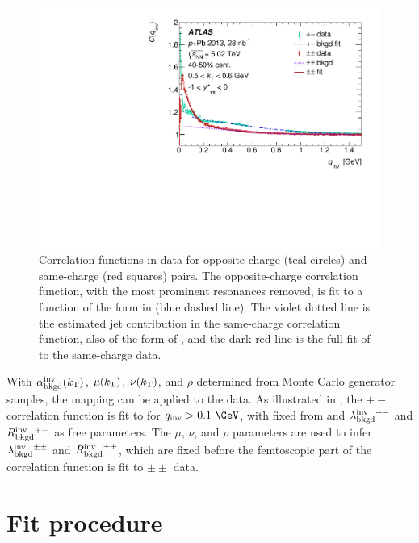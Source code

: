 \begin{figure}[t]
\centering
\includegraphics{cqinv_charge_comp_cent6_kt4_kys1.pdf}
\caption{Correlation functions in \pPb data for opposite-charge (teal circles) and same-charge (red squares) pairs. The opposite-charge correlation function, with the most prominent resonances removed, is fit to a function of the form in  (blue dashed line). The violet dotted line is the estimated jet contribution in the same-charge correlation function, also of the form of , and the dark red line is the full fit of  to the same-charge data.}
\label{fig:hp_example}
\end{figure}

With $\alpha_{\mathrm{bkgd}}^{\mathrm{inv}}(k_\mathrm{T})$, $\mu(k_\mathrm{T})$, $\nu(k_\mathrm{T})$, and $\rho$ determined from Monte Carlo generator samples, the mapping can be applied to the \pPb data.
As illustrated in , the $+-$ correlation function is fit to  for $\qinv > 0.1~\GeV$, with \abkgd fixed from \PYEight and $\lambda_{\mathrm{bkgd}}^{\mathrm{inv}}{}^{+-}$ and $R_{\mathrm{bkgd}}^{\mathrm{inv}}{}^{+-}$ as free parameters.
The $\mu$, $\nu$, and $\rho$ parameters are used to infer $\lambda_{\mathrm{bkgd}}^{\mathrm{inv}}{}^{\pm\pm}$ and $R_{\mathrm{bkgd}}^{\mathrm{inv}}{}^{\pm\pm}$, which are fixed before the femtoscopic part of the correlation function is fit to $\pm\pm$ data.

\FloatBarrier

\section{Fit procedure}

